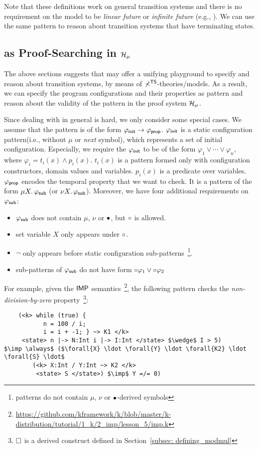 \documentclass{almostllncs}
\begin{document}
\noindent
Note that these definitions work on general transition systems and there is no requirement on the model to be \emph{linear future} or \emph{infinite future} (e.g., \LTL).
We can use the same pattern to reason about transition systems that have terminating states.

\subsection{\BMC as Proof-Searching in $\mathcal{H}_\mu$}

The above sections suggests that \mmul may offer a unifying playground to
specify and reason about transition systems, by means of $\mathbb{\Sigma}^{\textnormal{\textsf{TS}}}$-theories/models.
As a result, we can specify the program configurations and their properties as \mmul pattern and reason about the validity of the pattern in the proof system $\mathcal{H}_\mu$.

Since dealing with \modmul in general is hard, we only consider some special cases.
We assume that the pattern is of the form $\varphi_{\textnormal{\textsf{init}}} \to \varphi_{\textnormal{\textsf{prop}}}$.
$\varphi_{\textnormal{\textsf{init}}}$ is a static configuration pattern(i.e., without $\mu$ or \emph{next} symbol), which represents a set of initial configuration.
Especially, we require the $\varphi_{\textnormal{\textsf{init}}}$ to be of the form $\varphi_1 \vee \cdots \vee \varphi_n$, where $\varphi_i = t_i(x) \wedge p_i(x)$.
$t_i(x)$ is a pattern formed only with configuration constructors, domain values and variables. 
$p_i(x)$ is a predicate over variables.
$\varphi_{\textnormal{\textsf{prop}}}$ encodes the temporal property that we want to check.
It is a pattern of the form $\mu X \mathord{.} \, \varphi_{\textnormal{\textsf{sub}}}$ (or $\nu X \mathord{.} \, \varphi_{\textnormal{\textsf{sub}}}$). 
Moreover, we have four additional requirements on $\varphi_{\textnormal{\textsf{sub}}}$:
\begin{itemize}
\item $\varphi_{\textnormal{\textsf{sub}}}$ does not contain $\mu$, $\nu$ or ${\bullet}$, but ${\circ}$ is allowed.
\item set variable $X$ only appears under ${\circ}$.
\item $\neg$ only appears before static configuration sub-patterns~\footnote{patterns do not contain $\mu$, $\nu$ or ${\bullet}$-derived symbols}.
\item sub-patterns of $\varphi_{\textnormal{\textsf{sub}}}$ do not have form ${\circ} \varphi_1 \vee {\circ} \varphi_2$
\end{itemize}
For example, given the ${\mathsf{IMP}}$ semantics~\footnote{\url{https://github.com/kframework/k/blob/master/k-distribution/tutorial/1_k/2_imp/lesson_5/imp.k}}, the following pattern checks the \emph{non-division-by-zero} property~\footnote{${\square}$ is a derived construct defined in Section~\ref{subsec: defining_modmul}}:
\begin{lstlisting}
    (<k> while (true) { 
           n = 100 / i;
           i = i + -1; } ~> K1 </k>
     <state> n |-> N:Int i |-> I:Int </state> $\wedge$ I > 5)
$\imp \always$ ($\forall{X} \ldot \forall{Y} \ldot \forall{K2} \ldot \forall{S} \ldot$
        (<k> X:Int / Y:Int ~> K2 </k> 
         <state> S </state>) $\imp$ Y =/= 0)
\end{lstlisting}
\end{document}
